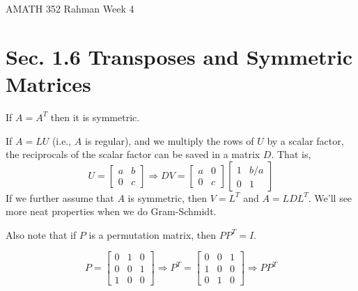 \documentclass[reqno]{amsart}
\theoremstyle{definition}
\begin{document}
\begin{flushleft}
{\sc \Large AMATH 352 Rahman} \hfill Week 4
\bigskip
\end{flushleft}

\newcommand{\R}{\mathbb{R}}
\newcommand{\N}{\mathbb{N}}
\newcommand{\Z}{\mathbb{Z}}
\newcommand{\Q}{\mathbb{Q}}
\renewcommand{\CancelColor}{\color{red}}
\newcommand{\?}{\stackrel{?}{=}}
\renewcommand{\varphi}{\phi}
\newcommand{\card}{\text{Card}}
\newcommand{\bigzero}{\text{\Huge 0}}
\newcommand{\curvearrowdown}{{\color{red}\rotatebox{90}{$\curvearrowleft$}}}
\newcommand{\curvearrowup}{{\color{red}\rotatebox{90}{$\curvearrowright$}}}



\section*{Sec. 1.6 Transposes and Symmetric Matrices}

{\color{red}If $A = A^T$ then it is symmetric.}

If $A = LU$ (i.e., $A$ is regular), and we multiply the rows of $U$ by a scalar factor, the reciprocals of the scalar factor can be saved in a matrix $D$.  That is,
%
\begin{equation*}
U = \begin{bmatrix}
a & b\\
0 & c
\end{bmatrix} \Rightarrow DV = \begin{bmatrix}
a & 0\\
0 & c
\end{bmatrix}\begin{bmatrix}
1 & b/a\\
0 & 1
\end{bmatrix}
\end{equation*}
%
If we further assume that $A$ is symmetric, then $V = L^T$ and $A = LDL^T$.  {\color{red}We'll see more neat properties when we do Gram-Schmidt}.

Also note that if $P$ is a permutation matrix, then $PP^T = I$.

\begin{equation*}
P = \begin{bmatrix}
0 & 1 & 0\\
0 & 0 & 1\\
1 & 0 & 0
\end{bmatrix} \Rightarrow P^T = \begin{bmatrix}
0 & 0 & 1\\
1 & 0 & 0\\
0 & 1 & 0
\end{bmatrix} \Rightarrow PP^T
\end{equation*}
\end{document}
